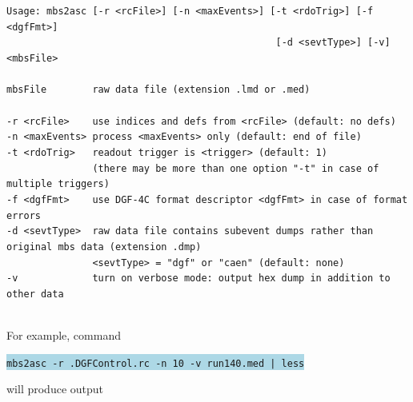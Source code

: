 \documentclass[10pt]{article}
\newcommand{\blue}[1]{\colorbox{lightblue}{\texttt{#1}}}
\newenvironment{yellowboxed}
	{\begin{Sbox}\begin{minipage}[t]}
	{\end{minipage}\end{Sbox}\colorbox{yellow}{\TheSbox}}
\begin{document}
{\scriptsize
\begin{yellowboxed}{\linewidth}
\verb+Usage: mbs2asc [-r <rcFile>] [-n <maxEvents>] [-t <rdoTrig>] [-f <dgfFmt>]+\\
\verb+                                               [-d <sevtType>] [-v] <mbsFile>+\\
\verb+ +\\
\verb+mbsFile        raw data file (extension .lmd or .med)+\\
\verb+ +\\
\verb+-r <rcFile>    use indices and defs from <rcFile> (default: no defs)+\\
\verb+-n <maxEvents> process <maxEvents> only (default: end of file)+\\
\verb+-t <rdoTrig>   readout trigger is <trigger> (default: 1)+\\
\verb+               (there may be more than one option "-t" in case of multiple triggers)+\\
\verb+-f <dgfFmt>    use DGF-4C format descriptor <dgfFmt> in case of format errors+\\
\verb+-d <sevtType>  raw data file contains subevent dumps rather than original mbs data (extension .dmp)+\\
\verb+               <sevtType> = "dgf" or "caen" (default: none)+\\
\verb+-v             turn on verbose mode: output hex dump in addition to other data+
\end{yellowboxed}}\\

For example, command\\

\centerline{\blue{mbs2asc -r .DGFControl.rc -n 10 -v run140.med | less}}\vspace{3mm}

will produce output\\
\end{document}
